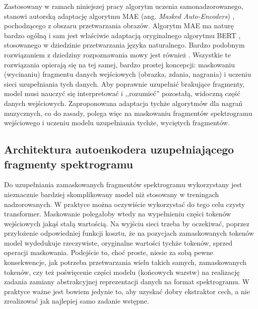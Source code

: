 Zastosowany w ramach niniejszej pracy algorytm uczenia samonadzorowanego, stanowi autorską adaptację algorytmu MAE (ang. \emph{Masked Auto-Encoders}) \cite{he_masked_2021}, pochodzącego z obszaru przetwarzania obrazów. Algorytm MAE ma naturę bardzo ogólną i sam jest właściwie adaptacją oryginalnego algorytmu BERT \cite{devlin_bert_2019}, stosowanego w dziedzinie przetwarzania języka naturalnego. Bardzo podobnym rozwiązaniem z dziedziny rozpoznawania mowy jest również \cite{baevski_wav2vec_2020}. Wszystkie te rozwiązania opierają się na tej samej, bardzo prostej koncepcji: maskowaniu (wycinaniu) fragmentu danych wejściowych (obrazka, zdania, nagrania) i uczeniu sieci uzupełniania tych danych. Aby poprawnie uzupełnić brakujące fragmenty, model musi nauczyć się interpretować i ,,rozumieć'' pozostałą, widoczną część danych wejściowych. Zaproponowana adaptacja tychże algorytmów dla nagrań muzycznych, co do zasady, polega więc na maskowaniu fragmentów spektrogramu wejściowego i uczeniu modelu uzupełniania tychże, wyciętych fragmentów.

\subsection{Architektura autoenkodera uzupełniającego fragmenty spektrogramu}

Do uzupełniania zamaskowanych fragmentów spektrogramu wykorzystany jest nieznacznie bardziej skomplikowany model niż stosowany w treningach nadzorowanych. W praktyce można oczywiście wykorzystać do tego celu czysty transformer. Maskowanie polegałoby wtedy na wypełnieniu części tokenów wejściowych jakąś stałą wartością. Na wyjściu sieci trzeba by oczekiwać, poprzez przyłożenie odpowiedniej funkcji kosztu, że na pozycjach zamaskowanych tokenów model wydedukuje rzeczywiste, oryginalne wartości tychże tokenów, sprzed operacji maskowania. Podejście to, choć proste, niesie za sobą pewne konsekwencje, jak potrzeba przetwarzania wielu takich samych, zamaskowanych tokenów, czy też poświęcenie części modelu (końcowych warstw) na realizację zadania zamiany abstrakcyjnej reprezentacji danych na format spektrogramu. W praktyce ważne jest bowiem jedynie to, aby uzyskać dobry ekstraktor cech, a nie zrealizować jak najlepiej samo zadanie wstępne.

